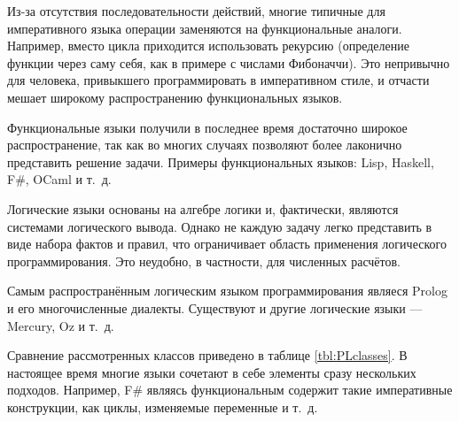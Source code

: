 Из-за отсутствия последовательности действий, многие типичные для
императивного языка операции заменяются на функциональные аналоги.
Например, вместо цикла приходится использовать рекурсию (определение
функции через саму себя, как в примере с числами Фибоначчи). Это
непривычно для человека, привыкшего программировать в императивном
стиле, и отчасти мешает широкому распространению функциональных
языков.

Функциональные языки получили в последнее время достаточно широкое
распространение, так как во многих случаях позволяют более лаконично
представить решение задачи. Примеры функциональных языков: Lisp,
Haskell, F\#, OCaml и т.~д.

Логические языки основаны на алгебре логики и, фактически, являются
системами логического вывода. Однако не каждую задачу легко
представить в виде набора фактов и правил, что ограничивает область
применения логического программирования. Это неудобно, в частности,
для численных расчётов.

Самым распространённым логическим языком программирования являеся
Prolog и его многочисленные диалекты. Существуют и другие логические
языки — Mercury, Oz и т.~д.

Сравнение рассмотренных классов приведено в таблице
\ref{tbl:PLclasses}.  В настоящее время многие языки сочетают в себе
элементы сразу нескольких подходов. Например, F\# являясь
функциональным содержит такие императивные конструкции, как циклы,
изменяемые переменные и т.~д.

